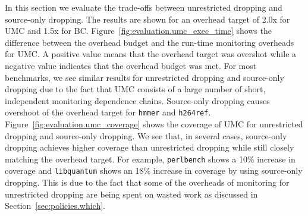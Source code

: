 In this section we evaluate the trade-offs between unrestricted dropping and source-only dropping.
The results are shown for an overhead target of 2.0x for UMC and 1.5x for BC.
Figure~\ref{fig:evaluation.umc_exec_time} shows the difference between the
overhead budget and the run-time monitoring overheads for UMC. A positive value
means that the overhead target was overshot while a negative value indicates
that the overhead budget was met. For most benchmarks, we see similar results for unrestricted
dropping and source-only dropping due to the fact that UMC consists of a large
number of short, independent monitoring dependence chains. Source-only dropping
causes overshoot of the overhead target for {\tt hmmer} and {\tt h264ref}.
Figure~\ref{fig:evaluation.umc_coverage} shows the coverage of UMC for
unrestricted dropping and source-only dropping. We see that, in several cases, source-only dropping
achieves higher coverage than unrestricted dropping while still closely matching the overhead target. For example, {\tt perlbench} shows a 10\% increase in coverage and {\tt libquantum} shows an 18\% increase in coverage by using source-only dropping. This is due
to the fact that some of the overheads of monitoring for unrestricted dropping
are being spent on wasted work as discussed in Section~\ref{sec:policies.which}.

